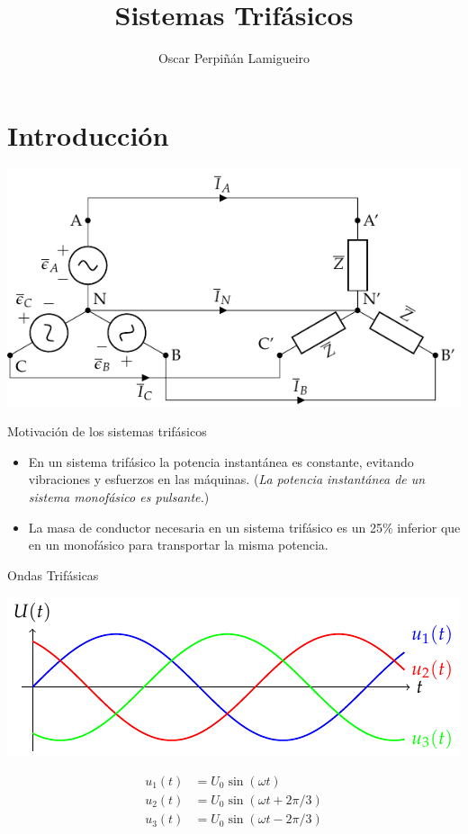 \documentclass[aspectratio=169, usenames,svgnames,dvipsnames]{beamer}
\author{Oscar Perpiñán Lamigueiro}
\date{}
\title{Sistemas Trifásicos}
\begin{document}
\maketitle

\section{Introducción}
\label{sec:org7c96306}

\begin{frame}[label={sec:org785c195},plain]{}
\begin{center}
\includegraphics[width=.9\linewidth]{../figs/EstrellaEquilibrado.pdf}
\end{center}
\end{frame}

\begin{frame}[label={sec:org367756f}]{Motivación de los sistemas trifásicos}
\begin{itemize}
\item En un sistema trifásico la potencia instantánea es constante, evitando vibraciones y esfuerzos en las máquinas. (\emph{La potencia instantánea de un sistema monofásico es pulsante.})

\item La masa de conductor necesaria en un sistema trifásico es un 25\% inferior que en un monofásico para transportar la misma potencia.
\end{itemize}
\end{frame}

\begin{frame}[label={sec:org97c84bd}]{Ondas Trifásicas}
\begin{center}
\includegraphics[width=.9\linewidth]{../figs/TensionesTrifasica.pdf}
\end{center}

\begin{align*}
  u_1(t) &= U_0 \sin(\omega t)\\
  u_2(t) &= U_0 \sin(\omega t + 2\pi/3)\\
  u_3(t) &= U_0 \sin(\omega t - 2\pi/3)
\end{align*}
\end{frame}
\end{document}
